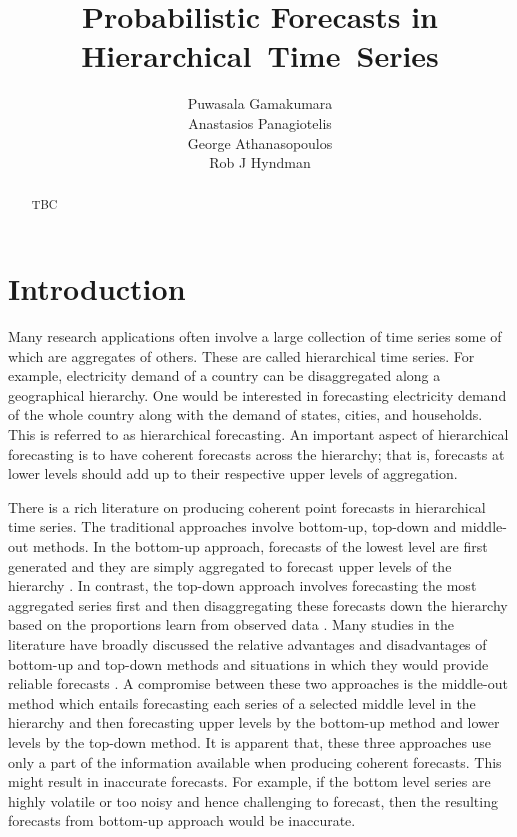 \documentclass[a4paper, 11pt]{article}
\title{Probabilistic Forecasts in Hierarchical~Time~Series}
\author{Puwasala Gamakumara\\ Anastasios Panagiotelis\\ George Athanasopoulos\\ Rob J Hyndman}
\begin{document}
	
	\maketitle
	
	\begin{abstract}
		TBC
	\end{abstract}
	
	
	\section{Introduction}\label{sec:intro}
	
	Many research applications often involve a large collection of time series some of which are aggregates of others. These are called hierarchical time series. For example, electricity demand of a country can be disaggregated along a geographical hierarchy. One would be interested in forecasting electricity demand of the whole country along with the demand of states, cities, and households. This is referred to as hierarchical forecasting. An important aspect of hierarchical forecasting is to have coherent forecasts across the hierarchy; that is, forecasts at lower levels should add up to their respective upper levels of aggregation.
	
	There is a rich literature on producing coherent point forecasts in hierarchical time series. The traditional approaches involve bottom-up, top-down and middle-out methods. In the bottom-up approach, forecasts of the lowest level are first generated and they are simply aggregated to forecast upper levels of the hierarchy \citep{Dunn1976}.  
	In contrast, the top-down approach involves forecasting the most aggregated series first and then disaggregating these forecasts down the hierarchy based on the proportions learn from observed data \citep{Gross1990}. 
	Many studies in the literature have broadly discussed the relative advantages and disadvantages of bottom-up and top-down methods and situations in which they would provide reliable forecasts \citep{Schwarzkopf1988,Kahn1998, Lapide1998,Fliedner2001}.
	A compromise between these two approaches is the middle-out method which entails forecasting each series of a selected middle level in the hierarchy and then forecasting upper levels by the bottom-up method and lower levels by the top-down method. It is apparent that, these three approaches use only a part of the information available when producing coherent forecasts. This might result in inaccurate forecasts. For example, if the bottom level series are highly volatile or too noisy and hence challenging to forecast, then the resulting forecasts from bottom-up approach would be inaccurate.
	
\end{document}

